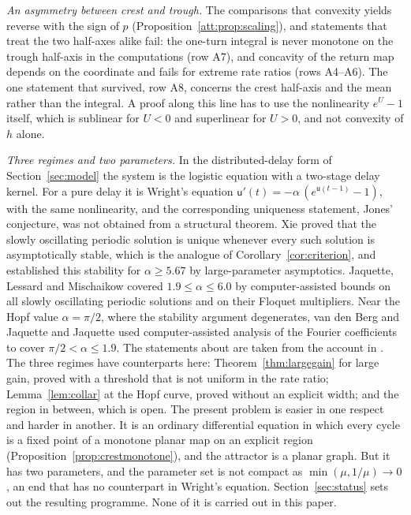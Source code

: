\emph{An asymmetry between crest and trough.} The comparisons that convexity yields reverse with the sign of $p$ (Proposition~\ref{att:prop:scaling}), and statements that treat the two half-axes alike fail: the one-turn integral is never monotone on the trough half-axis in the computations (row A7), and concavity of the return map depends on the coordinate and fails for extreme rate ratios (rows A4--A6). The one statement that survived, row A8, concerns the crest half-axis and the mean rather than the integral. A proof along this line has to use the nonlinearity $e^{U}-1$ itself, which is sublinear for $U<0$ and superlinear for $U>0$, and not convexity of $h$ alone.

\emph{Three regimes and two parameters.} In the distributed-delay form of Section~\ref{sec:model} the system is the logistic equation with a two-stage delay kernel. For a pure delay it is Wright's equation $\mathsf u'(t)=-\alpha\,(e^{\mathsf u(t-1)}-1)$, with the same nonlinearity, and the corresponding uniqueness statement, Jones' conjecture, was not obtained from a structural theorem. Xie \cite{Xie93} proved that the slowly oscillating periodic solution is unique whenever every such solution is asymptotically stable, which is the analogue of Corollary~\ref{cor:criterion}, and established this stability for $\alpha\ge5.67$ by large-parameter asymptotics. Jaquette, Lessard and Mischaikow \cite{JLM17} covered $1.9\le\alpha\le6.0$ by computer-assisted bounds on all slowly oscillating periodic solutions and on their Floquet multipliers. Near the Hopf value $\alpha=\pi/2$, where the stability argument degenerates, van den Berg and Jaquette \cite{vdBJ18} and Jaquette \cite{Jaquette19} used computer-assisted analysis of the Fourier coefficients to cover $\pi/2<\alpha\le1.9$. The statements about \cite{Xie93} are taken from the account in \cite{JLM17}. The three regimes have counterparts here: Theorem~\ref{thm:largegain} for large gain, proved with a threshold that is not uniform in the rate ratio; Lemma~\ref{lem:collar} at the Hopf curve, proved without an explicit width; and the region in between, which is open. The present problem is easier in one respect and harder in another. It is an ordinary differential equation in which every cycle is a fixed point of a monotone planar map on an explicit region (Proposition~\ref{prop:crestmonotone}), and the attractor is a planar graph. But it has two parameters, and the parameter set is not compact as $\min(\mu,1/\mu)\to0$, an end that has no counterpart in Wright's equation. Section~\ref{sec:status} sets out the resulting programme. None of it is carried out in this paper.
